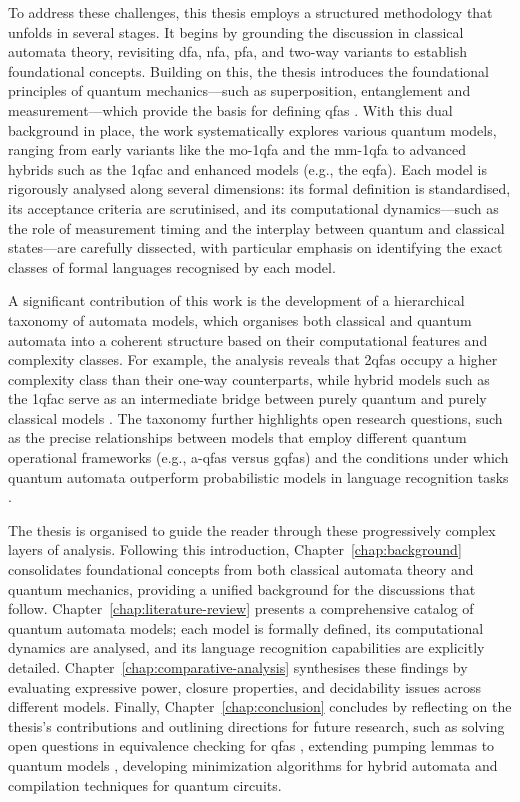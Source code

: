To address these challenges, this thesis employs a structured methodology that unfolds in several stages. It begins by grounding the discussion in classical automata theory, revisiting \gls{dfa}, \gls{nfa}, \gls{pfa}, and two-way variants to establish foundational concepts. Building on this, the thesis introduces the foundational principles of quantum mechanics—such as superposition, entanglement and measurement—which provide the basis for defining \glspl{qfa} \cite{nielsen2010quantum}. With this dual background in place, the work systematically explores various quantum models, ranging from early variants like the \gls{mo-1qfa} \cite{moore2000quantum} and the \gls{mm-1qfa} \cite{kondacs1997power} to advanced hybrids such as the \gls{1qfac} and enhanced models (e.g., the \gls{eqfa}). Each model is rigorously analysed along several dimensions: its formal definition is standardised, its acceptance criteria are scrutinised, and its computational dynamics—such as the role of measurement timing and the interplay between quantum and classical states—are carefully dissected, with particular emphasis on identifying the exact classes of formal languages recognised by each model.

A significant contribution of this work is the development of a hierarchical taxonomy of automata models, which organises both classical and quantum automata into a coherent structure based on their computational features and complexity classes. For example, the analysis reveals that \glspl{2qfa} occupy a higher complexity class than their one-way counterparts, while hybrid models such as the \gls{1qfac} serve as an intermediate bridge between purely quantum and purely classical models \cite{yakaryilmaz2010succinctness}. The taxonomy further highlights open research questions, such as the precise relationships between models that employ different quantum operational frameworks (e.g., \glspl{a-qfa} versus \glspl{gqfa}) and the conditions under which quantum automata outperform probabilistic models in language recognition tasks \cite{hirvensalo2012quantum}.

The thesis is organised to guide the reader through these progressively complex layers of analysis. Following this introduction, Chapter~\ref{chap:background} consolidates foundational concepts from both classical automata theory and quantum mechanics, providing a unified background for the discussions that follow. Chapter~\ref{chap:literature-review} presents a comprehensive catalog of quantum automata models; each model is formally defined, its computational dynamics are analysed, and its language recognition capabilities are explicitly detailed. Chapter~\ref{chap:comparative-analysis} synthesises these findings by evaluating expressive power, closure properties, and decidability issues across different models. Finally, Chapter~\ref{chap:conclusion} concludes by reflecting on the thesis’s contributions and outlining directions for future research, such as solving open questions in equivalence checking for \glspl{qfa} \cite{li2012characterizations}, extending pumping lemmas to quantum models \cite{yakaryilmaz2014quantum}, developing minimization algorithms for hybrid automata and compilation techniques for quantum circuits.

